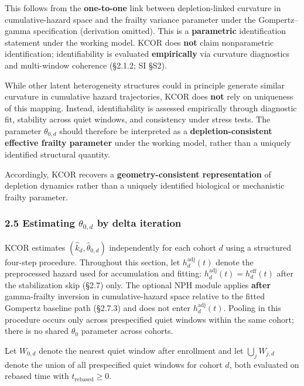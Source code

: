 \documentclass[
]{article}
\begin{document}
This follows from the \textbf{one-to-one} link between depletion-linked
curvature in cumulative-hazard space and the frailty variance parameter
under the Gompertz--gamma specification (derivation omitted). This is a
\textbf{parametric} identification statement under the working model.
KCOR does \textbf{not} claim nonparametric identification;
identifiability is evaluated \textbf{empirically} via curvature
diagnostics and multi-window coherence (§2.1.2; SI §S2).

While other latent heterogeneity structures could in principle generate
similar curvature in cumulative hazard trajectories, KCOR does
\textbf{not} rely on uniqueness of this mapping. Instead,
identifiability is assessed empirically through diagnostic fit,
stability across quiet windows, and consistency under stress tests. The
parameter \(\theta_{0,d}\) should therefore be interpreted as a
\textbf{depletion-consistent effective frailty parameter} under the
working model, rather than a uniquely identified structural quantity.

Accordingly, KCOR recovers a \textbf{geometry-consistent representation}
of depletion dynamics rather than a uniquely identified biological or
mechanistic frailty parameter.

\subsubsection{\texorpdfstring{2.5 Estimating \(\theta_{0,d}\) by delta
iteration}{2.5 Estimating \textbackslash theta\_\{0,d\} by delta iteration}}\label{estimating-theta_0d-by-delta-iteration}

KCOR estimates \((\hat{k}_d,\hat{\theta}_{0,d})\) independently for each
cohort \(d\) using a structured four-step procedure. Throughout this
section, let \(h_d^{\mathrm{adj}}(t)\) denote the preprocessed hazard
used for accumulation and fitting:
\(h_d^{\mathrm{adj}}(t)=h_d^{\mathrm{eff}}(t)\) after the stabilization
skip (§2.7) only. The optional NPH module applies \textbf{after}
gamma-frailty inversion in cumulative-hazard space relative to the
fitted Gompertz baseline path (§2.7.3) and does not enter
\(h_d^{\mathrm{adj}}(t)\). Pooling in this procedure occurs only across
prespecified quiet windows within the same cohort; there is no shared
\(\theta_0\) parameter across cohorts.

Let \(W_{0,d}\) denote the nearest quiet window after enrollment and let
\(\bigcup_j W_{j,d}\) denote the union of all prespecified quiet windows
for cohort \(d\), both evaluated on rebased time with
\(t_{\mathrm{rebased}} \ge 0\).
\end{document}
